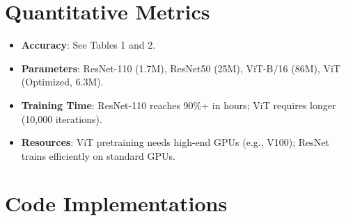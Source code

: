 \documentclass[UTF8]{report}
\theoremstyle{MyLineTheoremStyle} %
\theoremstyle{MyBlockTheoremStyle} %
\theoremstyle{MySubsubsectionStyle} %
\begin{document}
\section*{Quantitative Metrics}
\begin{itemize}
    \item \textbf{Accuracy}: See Tables 1 and 2.
    \item \textbf{Parameters}: ResNet-110 (1.7M), ResNet50 (25M), ViT-B/16 (86M), ViT (Optimized, 6.3M).
    \item \textbf{Training Time}: ResNet-110 reaches 90\%+ in hours; ViT requires longer (10,000 iterations).
    \item \textbf{Resources}: ViT pretraining needs high-end GPUs (e.g., V100); ResNet trains efficiently on standard GPUs.
\end{itemize}

\section*{Code Implementations}
\end{document}
